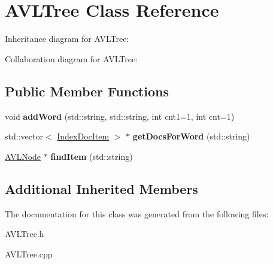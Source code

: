 \hypertarget{classAVLTree}{}\section{A\+V\+L\+Tree Class Reference}
\label{classAVLTree}


Inheritance diagram for A\+V\+L\+Tree\+:


Collaboration diagram for A\+V\+L\+Tree\+:
\subsection*{Public Member Functions}
\begin{DoxyCompactItemize}
\item 
void {\bfseries add\+Word} (std\+::string, std\+::string, int cnt1=1, int cnt=1)\hypertarget{classAVLTree_aa5a6bf25085322f2caef01bb10475e7a}{}\label{classAVLTree_aa5a6bf25085322f2caef01bb10475e7a}

\item 
std\+::vector$<$ \hyperlink{classIndexDocItem}{Index\+Doc\+Item} $>$ $\ast$ {\bfseries get\+Docs\+For\+Word} (std\+::string)\hypertarget{classAVLTree_a3e848f844e1c88884bf4a3a19d179056}{}\label{classAVLTree_a3e848f844e1c88884bf4a3a19d179056}

\item 
\hyperlink{classAVLNode}{A\+V\+L\+Node} $\ast$ {\bfseries find\+Item} (std\+::string)\hypertarget{classAVLTree_a1821c065326838ae7fa16032a42ad91b}{}\label{classAVLTree_a1821c065326838ae7fa16032a42ad91b}

\end{DoxyCompactItemize}
\subsection*{Additional Inherited Members}


The documentation for this class was generated from the following files\+:\begin{DoxyCompactItemize}
\item 
A\+V\+L\+Tree.\+h\item 
A\+V\+L\+Tree.\+cpp\end{DoxyCompactItemize}

